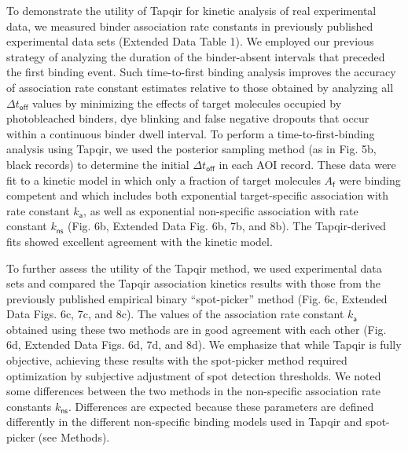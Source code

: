 To demonstrate the utility of Tapqir for kinetic analysis of real experimental data, we measured binder association rate constants in previously published experimental data sets (Extended Data Table 1).  We employed our previous strategy  \cite{Friedman2012-if,Friedman2015-nx} of analyzing the duration of the binder-absent intervals that preceded the first binding event.  Such time-to-first binding analysis improves the accuracy of association rate constant estimates relative to those obtained by analyzing all $\Delta t_\mathsf{off}$ values by minimizing the effects of target molecules occupied by photobleached binders, dye blinking and false negative dropouts that occur within a continuous binder dwell interval.  To perform a time-to-first-binding analysis using Tapqir, we used the posterior sampling method (as in Fig. 5b, black records) to determine the initial $\Delta t_\mathsf{off}$ in each AOI record. These data were fit to a kinetic model \cite{Friedman2012-if,Friedman2015-nx} in which only a fraction of target molecules $A_\mathsf{f}$ were binding competent and which includes both exponential target-specific association with rate constant $k_\mathsf{a}$, as well as exponential non-specific association with rate constant $k_\mathsf{ns}$ (Fig. 6b, Extended Data Fig. 6b, 7b, and 8b).  The Tapqir-derived fits showed excellent agreement with the kinetic model.  

To further assess the utility of the Tapqir method, we used experimental data sets and compared the Tapqir association kinetics results with those from the previously published empirical binary ``spot-picker'' method \cite{Friedman2015-nx} (Fig. 6c, Extended Data Figs. 6c, 7c, and 8c). The values of the association rate constant $k_\mathsf{a}$ obtained using these two methods are in good agreement with each other (Fig. 6d, Extended Data Figs. 6d, 7d, and 8d). We emphasize that while Tapqir is fully objective, achieving these results with the spot-picker method required optimization by subjective adjustment of spot detection thresholds.  We noted some differences between the two methods in the non-specific association rate constants $k_\mathsf{ns}$. Differences are expected because these parameters are defined differently in the different non-specific binding models used in Tapqir and  spot-picker (see Methods).
